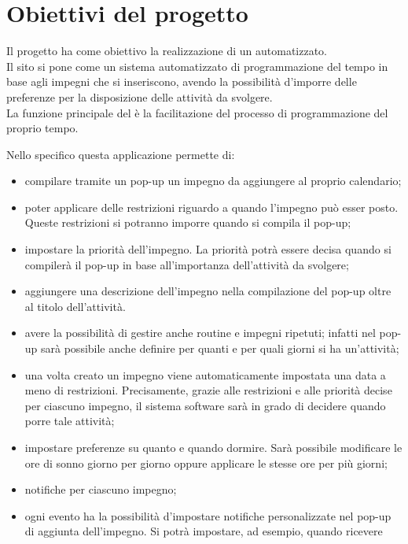 \section{Obiettivi del progetto}
Il progetto ha come obiettivo la realizzazione di un \nome automatizzato.\\
Il sito si pone come un sistema automatizzato di programmazione del tempo in base agli impegni che si inseriscono, avendo la possibilità d'imporre delle preferenze per la disposizione delle attività da svolgere.\\
La funzione principale del \nome è la facilitazione del processo di programmazione del proprio tempo.

\vspace{0.5cm}

Nello specifico questa applicazione permette di:
\begin{itemize}
    \item compilare tramite un pop-up un impegno da aggiungere al proprio calendario; 
    \item poter applicare delle restrizioni riguardo a quando l'impegno può esser posto. Queste
    restrizioni si potranno imporre quando si compila il pop-up;
    \item impostare la priorità dell'impegno. La priorità potrà essere decisa quando si compilerà il pop-up in base all'importanza dell'attività da svolgere;
    \item aggiungere una descrizione dell'impegno nella compilazione del pop-up oltre al titolo dell'attività.
    \item avere la possibilità di gestire anche routine e impegni ripetuti; infatti nel pop-up sarà possibile anche 
    definire per quanti e per quali giorni si ha un'attività;
    \item una volta creato un impegno viene automaticamente impostata una data a meno di restrizioni. Precisamente, grazie alle restrizioni e alle priorità decise per ciascuno
    impegno, il sistema software sarà in grado di decidere quando porre tale attività;
    \item impostare preferenze su quanto e quando dormire. Sarà possibile modificare le ore di sonno giorno per giorno oppure
    applicare le stesse ore per più giorni;
    \item notifiche per ciascuno impegno;
    \item ogni evento ha la possibilità d'impostare notifiche personalizzate nel pop-up di aggiunta dell'impegno. Si potrà impostare, ad esempio, quando ricevere

\end{itemize}
